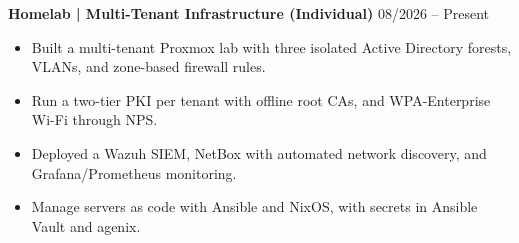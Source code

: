 \noindent
\textbf{Homelab | Multi-Tenant Infrastructure (Individual)} \hfill 08/2026 -- Present
\begin{itemize}
    \item Built a multi-tenant Proxmox lab with three isolated Active Directory forests, VLANs, and zone-based firewall rules.
    \item Run a two-tier PKI per tenant with offline root CAs, and WPA-Enterprise Wi-Fi through NPS.
    \item Deployed a Wazuh SIEM, NetBox with automated network discovery, and Grafana/Prometheus monitoring.
    \item Manage servers as code with Ansible and NixOS, with secrets in Ansible Vault and agenix.
\end{itemize}

